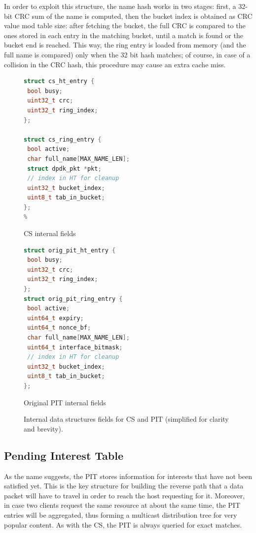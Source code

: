\documentclass[11pt,a4paper,twoside,titlepage,openany]{book}
\begin{document}
In order to exploit this structure, the name hash works in two stages: first, a 32-bit \gls{CRC} sum of the name is computed, then the bucket index is obtained as CRC value mod table size: after fetching the bucket, the full \gls{CRC} is compared to the ones stored in each entry in the matching bucket, until a match is found or the bucket end is reached. This way, the ring entry is loaded from memory (and the full name is compared) only when the 32 bit hash matches; of course, in case of a collision in the CRC hash, this procedure may cause an extra cache miss.

\begin{figure}[tb]
  \captionsetup{type=lstlisting}
  \begin{sublstlisting}[t]{.5\linewidth}
  \begin{lstlisting}[language=c,escapechar=\%]
struct cs_ht_entry {
 bool busy;
 uint32_t crc;
 uint32_t ring_index;
};

struct cs_ring_entry {
 bool active;
 char full_name[MAX_NAME_LEN];
 struct dpdk_pkt *pkt;
 // index in HT for cleanup
 uint32_t bucket_index;
 uint8_t tab_in_bucket;
};
%
    \end{lstlisting}
    \caption{CS internal fields}\label{lst:augustus.cs}
  \end{sublstlisting}%
  \begin{sublstlisting}[t]{.5\linewidth}
  \begin{lstlisting}[language=c]
struct orig_pit_ht_entry {
 bool busy;
 uint32_t crc;
 uint32_t ring_index;
};
struct orig_pit_ring_entry {
 bool active;
 uint64_t expiry;
 uint64_t nonce_bf;
 char full_name[MAX_NAME_LEN];
 uint64_t interface_bitmask;
 // index in HT for cleanup
 uint32_t bucket_index;
 uint8_t tab_in_bucket;
};
    \end{lstlisting}
    \caption{Original PIT internal fields}\label{lst:augustus.oldpit}
  \end{sublstlisting}
  \caption[CS and original PIT internal data structures fields]{Internal data structures fields for CS and PIT (simplified for clarity and brevity).}\label{lst:augustus.cs_oldpit}
\end{figure}

\subsection{Pending Interest Table}\label{sec:augustus.pit}
As the name suggests, the \gls{PIT} stores information for interests that have not been satisfied yet. This is the key structure for building the reverse path that a data packet will have to travel in order to reach the host requesting for it. Moreover, in case two clients request the same resource at about the same time, the PIT entries will be aggregated, thus forming a multicast distribution tree for very popular content.
As with the \gls{CS}, the PIT is always queried for exact matches.
\end{document}
